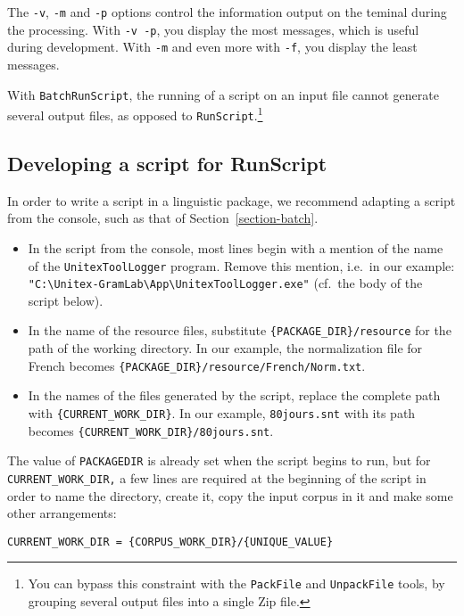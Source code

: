 \noindent The \verb$-v$, \verb$-m$ and \verb$-p$ options control the information output on the
teminal during the processing. With \verb$-v -p$, you display the most messages, which is
useful during development. With \verb$-m$ and even more with \verb$-f$, you display the least
messages.

\bigskip
\noindent With \verb$BatchRunScript$, the running of a script on an input file cannot generate
several output files, as opposed to \verb$RunScript$.\footnote{You can bypass this constraint
with the \texttt{PackFile} and \texttt{UnpackFile} tools, by grouping several output files
into a single Zip file.}



\subsection{Developing a script for RunScript}
\label{section-script-for-runscript}
In order to write a script in a linguistic package, we recommend adapting a script from the
console, such as that of Section~\ref{section-batch}.

\begin{itemize}
\item In the script from the console, most lines begin with a mention of the name of the
\verb$UnitexToolLogger$ program. Remove this mention, i.e.\ in our example:\\
\verb$"C:\Unitex-GramLab\App\UnitexToolLogger.exe"$ (cf.\ the body of the script below).
\item In the name of the resource files, substitute
\verb${PACKAGE_DIR}/resource$ for the path of the working directory.
In our example, the normalization file for French becomes
\verb${PACKAGE_DIR}/resource/French/Norm.txt$.
\item In the names of the files generated by the script, replace the complete path with
\verb${CURRENT_WORK_DIR}$. In our example, \verb$80jours.snt$ with its path
becomes \verb${CURRENT_WORK_DIR}/80jours.snt$.
\end{itemize}

\noindent The value of \verb$PACKAGEDIR$ is already set when the script begins to run, but
for \verb$CURRENT_WORK_DIR,$ a few lines are required at the beginning of the script
in order to name the directory, create it, copy the input corpus in it and make some
other arrangements:

\begin{Verbatim}[fontsize=\small,fontfamily=helvetica]
CURRENT_WORK_DIR = {CORPUS_WORK_DIR}/{UNIQUE_VALUE}
\end{Verbatim}

